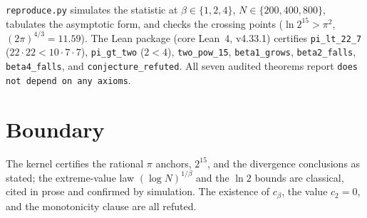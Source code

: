 \documentclass[11pt]{article}
\begin{document}
\texttt{reproduce.py} simulates the statistic at $\beta \in
\{1,2,4\}$, $N \in \{200, 400, 800\}$, tabulates the asymptotic
form, and checks the crossing points ($\ln 2^{15} > \pi^2$,
$(2\pi)^{4/3} = 11.59$). The Lean package (core Lean~4, v4.33.1)
certifies \texttt{pi\_lt\_22\_7} ($22 \cdot 22 < 10 \cdot 7 \cdot
7$), \texttt{pi\_gt\_two} ($2 < 4$), \texttt{two\_pow\_15},
\texttt{beta1\_grows}, \texttt{beta2\_falls}, \texttt{beta4\_falls},
and \texttt{conjecture\_refuted}. All seven audited theorems report
\texttt{does not depend on any axioms}.

\section{Boundary}

The kernel certifies the rational $\pi$ anchors, $2^{15}$, and the
divergence conclusions as stated; the extreme-value law
$(\log N)^{1/\beta}$ and the $\ln 2$ bounds are classical, cited in
prose and confirmed by simulation. The existence of $c_\beta$, the
value $c_2 = 0$, and the monotonicity clause are all refuted.
\end{document}
